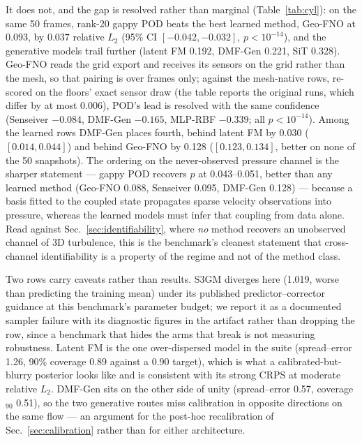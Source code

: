 \documentclass[aip,pof,reprint,amsmath,amssymb,superscriptaddress]{revtex4-1}
\newcommand{\dmfgen}{DMF-Gen}
\begin{document}
It does not, and the gap is resolved rather than marginal
(Table~\ref{tab:cyl}): on the same 50 frames, rank-20 gappy POD beats the best
learned method, Geo-FNO at 0.093, by $0.037$ relative $L_2$ (95\% CI
$[-0.042,-0.032]$, $p<10^{-14}$), and the generative models trail further
(latent FM 0.192, \dmfgen{} 0.221, SiT 0.328). Geo-FNO reads the grid export
and receives its sensors on the grid rather than the mesh, so that pairing is
over frames only; against the mesh-native rows, re-scored on the floors' exact
sensor draw (the table reports the original runs, which differ by at most
0.006), POD's lead is resolved with the same confidence (Senseiver $-0.084$,
\dmfgen{} $-0.165$, MLP-RBF $-0.339$; all $p<10^{-14}$). Among the learned
rows \dmfgen{} places fourth, behind latent FM by 0.030 ($[0.014, 0.044]$) and
behind Geo-FNO by 0.128 ($[0.123, 0.134]$, better on none of the 50
snapshots).
The ordering on the never-observed pressure channel is the sharper statement
--- gappy POD recovers $p$ at 0.043--0.051, better than any learned method
(Geo-FNO 0.088, Senseiver 0.095, \dmfgen{} 0.128) --- because a basis fitted
to the coupled state propagates sparse velocity observations into pressure,
whereas the learned models must infer that coupling from data alone. Read
against Sec.~\ref{sec:identifiability}, where \emph{no} method recovers an
unobserved channel of 3D turbulence, this is the benchmark's cleanest
statement that cross-channel identifiability is a property of the regime and
not of the method class.

Two rows carry caveats rather than results. S3GM diverges here (1.019, worse
than predicting the training mean) under its published predictor--corrector
guidance at this benchmark's parameter budget; we report it as a documented
sampler failure with its diagnostic figures in the artifact rather than
dropping the row, since a benchmark that hides the arms that break is not
measuring robustness. Latent FM is the one over-dispersed model in the suite
(spread--error 1.26, 90\% coverage 0.89 against a 0.90 target), which is what
a calibrated-but-blurry posterior looks like and is consistent with its strong
CRPS at moderate relative $L_2$. \dmfgen{} sits on the other side
of unity (spread--error 0.57, coverage$_{90}$ 0.51), so the two generative
routes miss calibration in opposite directions on the same flow --- an
argument for the post-hoc recalibration of Sec.~\ref{sec:calibration} rather
than for either architecture.
\end{document}
